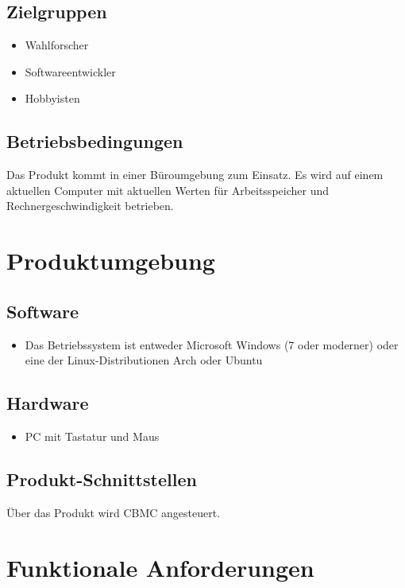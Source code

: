 \documentclass[a4paper]{scrreprt}
\begin{document}
\section{Zielgruppen}
\begin{itemize}
\item Wahlforscher
\item Softwareentwickler
\item Hobbyisten
\end{itemize}

\section{Betriebsbedingungen}
Das Produkt kommt in einer Büroumgebung zum Einsatz. Es wird auf einem aktuellen Computer mit aktuellen Werten für Arbeitsspeicher und Rechnergeschwindigkeit betrieben.


\chapter{Produktumgebung}

\section{Software}
\begin{itemize}
\item Das Betriebssystem ist entweder Microsoft Windows (7 oder moderner) oder eine der Linux-Distributionen Arch oder Ubuntu
\end{itemize}

\section{Hardware}
\begin{itemize}
\item PC mit Tastatur und Maus
\end{itemize}

\section{Produkt-Schnittstellen}
Über das Produkt wird \ac{CBMC} angesteuert.

\chapter{Funktionale Anforderungen}
\end{document}
